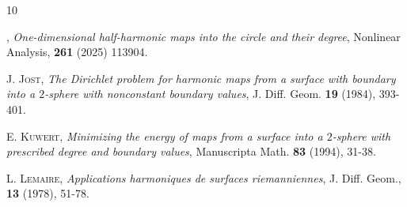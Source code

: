 \documentclass[12pt, a4paper]{article}
\newcommand{\sph}{\mathbb{S}}
\renewcommand{\(}{\left(}
\renewcommand{\)}{\right)}
\begin{document}
\begin{thebibliography}{10}








, \emph{One-dimensional half-harmonic maps into the circle and their degree}, Nonlinear Analysis, \textbf{261} (2025) 113904. 

 \textsc{J. Jost}, \emph{The Dirichlet problem for harmonic maps from a surface with boundary into a $2$-sphere with nonconstant boundary values}, J. Diff. Geom. \textbf{19} (1984), 393-401.

 \textsc{E. Kuwert}, \emph{Minimizing the energy of maps from a surface into a $2$-sphere with prescribed degree and boundary values}, Manuscripta Math. \textbf{83} (1994), 31-38.


 \textsc{L. Lemaire}, \emph{Applications harmoniques de surfaces riemanniennes}, J. Diff. Geom., \textbf{13} (1978), 51-78.


\end{thebibliography}
\end{document}
